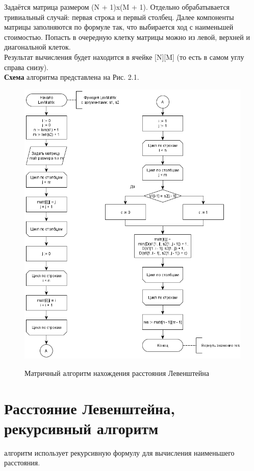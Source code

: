 \documentclass[12pt]{report}
\begin{document}
Задаётся матрица размером (N + 1)x(M + 1). Отдельно обрабатывается тривиальный случай: первая строка и первый столбец. 
Далее компоненты матрицы заполняются по формуле так, что выбирается ход с наименьшей стоимостью. 
Попасть в очередную клетку матрицы можно из левой, верхней и диагональной клеток.\\

Результат вычисления будет находится в ячейке [N][M] (то есть в самом углу справа снизу).\\

\textbf{Схема} алгоритма представлена на Рис. 2.1.

\begin{figure}[h]
	\begin{center}
		{\includegraphics[scale = 1]{LevMatrix}}
		\caption{Матричный алгоритм нахождения расстояния Левенштейна}
	\end{center}
\end{figure}

\section{Расстояние Левенштейна, рекурсивный алгоритм}
 алгоритм использует рекурсивную формулу для вычисления наименьшего расстояния. \\
\end{document}
